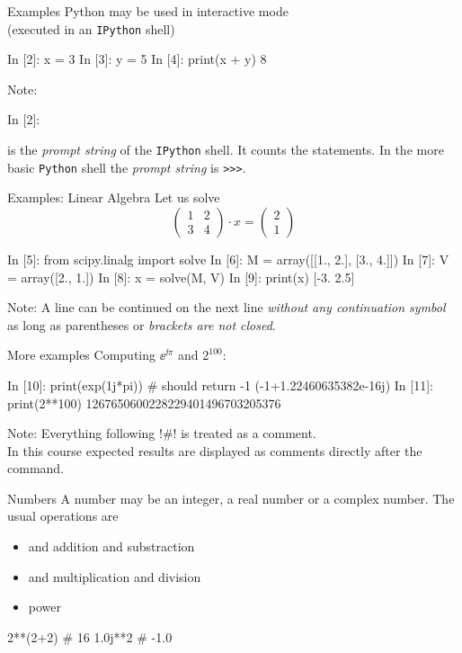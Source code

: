 \documentclass[hyperref={pdfpagelabels=false},table, handout]{beamer}
\begin{document}
\begin{frame}[fragile]{Examples}
Python may be used in \alert{interactive} mode \\
(executed in an \texttt{IPython} shell)
\begin{python}
In [2]: x = 3
In [3]: y = 5
In [4]: print(x + y)
8
\end{python}

Note:
\begin{python}
In [2]:
\end{python}
  is the \emph{prompt string} of the \texttt{IPython} shell. It counts the statements.
  In the more basic \texttt{Python} shell the \emph{prompt string} is \texttt{>\!>\!>}.
\end{frame}
\begin{frame}[fragile]{Examples: Linear Algebra}
Let us solve
\[\begin{pmatrix}1 &2\\3 &4\end{pmatrix} \cdot x = \begin{pmatrix}2\\1\end{pmatrix}\]
\begin{python}
In [5]: from scipy.linalg import solve
In [6]: M = array([[1., 2.],
                   [3., 4.]])
In [7]: V = array([2., 1.])
In [8]: x = solve(M, V)
In [9]: print(x)
[-3.   2.5]
\end{python}
Note: A line can be continued on the next line \emph{without any continuation symbol}
as long as parentheses or \emph{brackets are not closed}.
\end{frame}
\begin{frame}[fragile]{More examples}
Computing $\ee^{\ii\pi}$ and $2^{100}$:
\begin{python}
In [10]: print(exp(1j*pi)) # should return -1
(-1+1.22460635382e-16j)
In [11]: print(2**100)
1267650600228229401496703205376
\end{python}
Note: Everything following \pyth!#! is treated as a comment.\\
\vfill
{\tiny In this course expected results are displayed as comments directly after the command.}
\vfill
\end{frame}


\begin{frame}[fragile]{Numbers}
A number may be an \alert{integer}, a \alert{real number} or a \alert{complex number}.
The usual operations are
\begin{itemize}
\item \code{+} and \code{-} addition and substraction
\item \code{*} and \code{/} multiplication and division
\item \code{**} power
\end{itemize}
\begin{python}
2**(2+2) #  16
1.0j**2  # -1.0
\end{python}
\end{frame}
\end{document}
